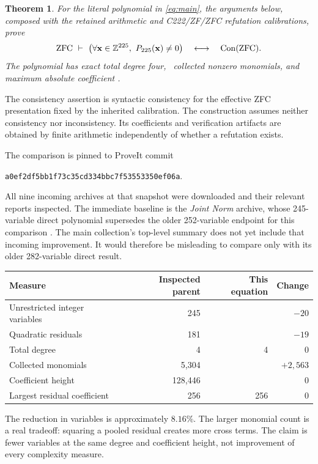 \documentclass[11pt,letterpaper]{article}
\newtheorem{theorem}{Theorem}[section]
\theoremstyle{definition}\newtheorem{definition}[theorem]{Definition}
\theoremstyle{remark}\newtheorem{remark}[theorem]{Remark}
\newcommand{\Z}{\mathbb Z}\newcommand{\N}{\mathbb N}
\newcommand{\Con}{\operatorname{Con}}
\begin{document}
\begin{theorem}\label{thm:main}
For the literal polynomial in \eqref{eq:main}, the arguments below, composed
with the retained arithmetic and C222/ZF/ZFC refutation calibrations, prove
\[
\mathrm{ZFC}\ \vdash\
\left(\forall\mathbf x\in\Z^{\NumVars},\ P_{\NumVars}(\mathbf x)\ne0\right)
\quad\longleftrightarrow\quad\Con(\mathrm{ZFC}).
\]
The polynomial has exact total degree four, \NumTerms\ collected nonzero
monomials, and maximum absolute coefficient \CoeffHeight.
\end{theorem}

The consistency assertion is syntactic consistency for the effective ZFC
presentation fixed by the inherited calibration. The construction assumes
neither consistency nor inconsistency. Its coefficients and verification
artifacts are obtained by finite arithmetic independently of whether a
refutation exists.

The comparison is pinned to ProveIt commit
\begin{center}\small\texttt{a0ef2df5bb1f73c35cd334bbc7f53553350ef06a}.\end{center}
All nine incoming archives at that snapshot were downloaded and their
relevant reports inspected. The immediate baseline is the
\emph{Joint Norm} archive, whose 245-variable direct polynomial supersedes
the older 252-variable endpoint for this comparison \cite{repo,joint}.
The main collection's top-level summary does not yet include that incoming
improvement. It would therefore be misleading to compare only with its
older 282-variable direct result.

\begin{center}
\begin{tabular}{lrrr}
\toprule
Measure & Inspected parent & This equation & Change\\
\midrule
Unrestricted integer variables & 245 & \NumVars & $-20$\\
Quadratic residuals & 181 & \NumRows & $-19$\\
Total degree & 4 & 4 & 0\\
Collected monomials & 5,304 & \NumTerms & $+2,563$\\
Coefficient height & 128,446 & \CoeffHeight & 0\\
Largest residual coefficient & 256 & 256 & 0\\
\bottomrule
\end{tabular}
\end{center}

The reduction in variables is approximately \(8.16\%\). The larger
monomial count is a real tradeoff: squaring a pooled residual creates more
cross terms. The claim is fewer variables at the same degree and
coefficient height, not improvement of every complexity measure.
\end{document}
